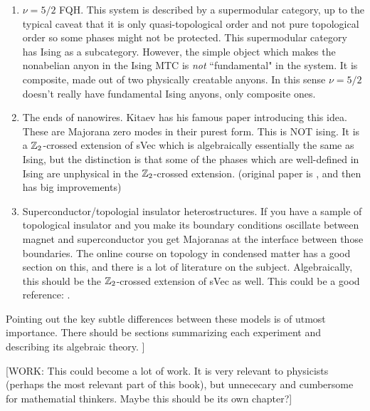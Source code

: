 \begin{enumerate}
\item $\nu=5/2$ FQH. This system is described by a supermodular category, up to the typical caveat that it is only quasi-topological order and not pure topological order so some phases might not be protected. This supermodular category has Ising as a subcategory. However, the simple object which makes the nonabelian anyon in the Ising MTC is \textit{not} ``fundamental" in the system. It is composite, made out of two physically creatable anyons. In this sense $\nu =5/2$ doesn't really have fundamental Ising anyons, only composite ones.

\item The ends of nanowires. Kitaev has his famous paper introducing this idea. These are Majorana zero modes in their purest form. This is NOT ising. It is a $\mathbb{Z}_2$-crossed extension of sVec which is algebraically essentially the same as Ising, but the distinction is that some of the phases which are well-defined in Ising are unphysical in the $\mathbb{Z}_2$-crossed extension. (original paper is \cite{kitaev2001unpaired}, and then \cite{fidkowski2011topological} has big improvements)

\item Superconductor/topologial insulator heterostructures. If you have a sample of topological insulator and you make its boundary conditions oscillate between magnet and superconductor you get Majoranas at the interface between those boundaries. The online course on topology in condensed matter has a good section on this, and there is a lot of literature on the subject. Algebraically, this should be the $\mathbb{Z}_2$-crossed extension of sVec as well. This could be a good reference: \cite{son2019commuting}.
\end{enumerate}

Pointing out the key subtle differences between these models is of utmost importance. There should be sections summarizing each experiment and describing its algebraic theory.
]

[WORK: This could become a lot of work. It is very relevant to physicists (perhaps the most relevant part of this book), but unnececary and cumbersome for mathematial thinkers. Maybe this should be its own chapter?]

